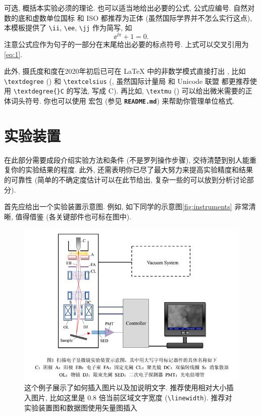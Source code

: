\documentclass[font=notofandol]{mpltx}
\newcommand{\note}[1]{{\color{gray}#1}}
\newcommand*\cs[1]{\texttt{\textbackslash #1}}
\newcommand*\code[1]{\texttt{#1}}
\newcommand*\file[1]{\textbf{\texttt{#1}}}
\begin{document}
可选, 概括本实验必须的理论.
也可以适当地给出必要的公式, 公式应编号.
\note{自然对数的底和虚数单位国标 \cite{GBT3102.11} 和 ISO \cite{ISO80000-2} 都推荐为正体 (虽然国际学界并不怎么实行这点), 本模板提供了 \cs{ii}, \cs{ee}, \cs{jj} 作为简写, 如
  \begin{equation}\label{eq:1}
    \ee^{\ii\pi}+1=0.
  \end{equation}
  注意公式应作为句子的一部分在末尾给出必要的标点符号.
  上式可以交叉引用为\autoref{eq:1}.}

\note{此外, 摄氏度和度在2020年初后已可在 \LaTeX{} 中的非数学模式直接打出 \cite{fntguide},
  比如 \cs{textdegree} (\textdegree) 和 \cs{textcelsius} (\textcelsius, 虽然国际计量局 \cite{si} 和 Unicode 联盟 \cite{unicode} 都更推荐使用 \code{\textbackslash{}textdegree\{\}C} 的写法, 写成 \textdegree{}C).
  再比如, \cs{textmu} (\textmu) 可以给出微米需要的正体词头符号.
  你也可以使用 \pkg{siunitx} 宏包 (参见 \file{README.md}) 来帮助你管理单位格式.}

\section{实验装置}
在此部分需要成段介绍实验方法和条件 (不是罗列操作步骤), 交待清楚到别人能重复你的实验结果的程度.
此外, 还需表明你已尽了最大努力来提高实验精度和结果的可靠性 (简单的不确定度估计可以在此节给出, 复杂一些的可以放到分析讨论部分).

首先应给出一个实验装置示意图.
例如, 如下同学的示意图\autoref{fig:instruments} 非常清晰, 值得借鉴 (各关键部件也可标在图中).

\begin{figure}
  \centering
  \includegraphics[width=0.85\linewidth]{fig/instruments.png}
  \caption{这个例子展示了如何插入图片以及加说明文字.
    \note{推荐使用相对大小插入图片, 比如这里是 0.8 倍当前区域文字宽度 (\cs{linewidth}).
      推荐对实验装置图和数据图使用矢量图插入}}
  \label{fig:instruments}
\end{figure}
\end{document}
